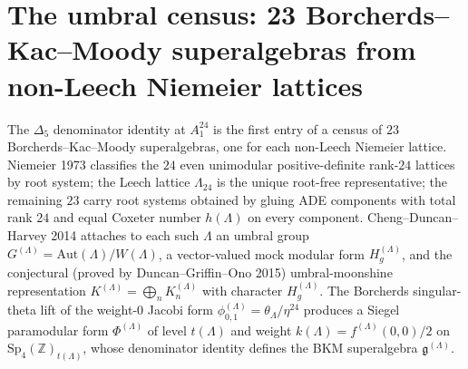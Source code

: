 \section{The umbral census: 23 Borcherds--Kac--Moody superalgebras from non-Leech Niemeier lattices}
\label{sec:k3ca-umbral-bkm-census}

The $\Delta_5$ denominator identity at $A_1^{24}$ is the first
entry of a census of $23$ Borcherds--Kac--Moody superalgebras, one
for each non-Leech Niemeier lattice. Niemeier 1973 classifies the
$24$ even unimodular positive-definite rank-$24$ lattices by
root system; the Leech lattice $\Lambda_{24}$ is the unique
root-free representative; the remaining $23$ carry root systems
obtained by gluing ADE components with total rank $24$ and equal
Coxeter number $h(\Lambda)$ on every component. Cheng--Duncan--Harvey
2014 attaches to each such $\Lambda$ an umbral group
$G^{(\Lambda)}=\mathrm{Aut}(\Lambda)/W(\Lambda)$, a vector-valued
mock modular form $H^{(\Lambda)}_g$, and the conjectural (proved
by Duncan--Griffin--Ono 2015) umbral-moonshine representation
$K^{(\Lambda)}=\bigoplus_n K^{(\Lambda)}_n$ with character
$H^{(\Lambda)}_g$. The Borcherds singular-theta lift of the
weight-$0$ Jacobi form $\phi^{(\Lambda)}_{0,1}=\theta_\Lambda/\eta^{24}$
produces a Siegel paramodular form $\Phi^{(\Lambda)}$ of level
$t(\Lambda)$ and weight $k(\Lambda)=f^{(\Lambda)}(0,0)/2$ on
$\mathrm{Sp}_4(\mathbb Z)_{t(\Lambda)}$, whose denominator
identity defines the BKM superalgebra $\mathfrak g^{(\Lambda)}$.


